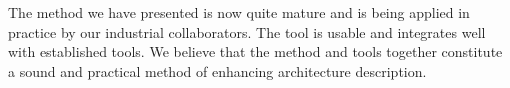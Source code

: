 \documentclass{llncs}
\begin{document}
The method we have presented is now quite mature and is being applied in practice by our industrial collaborators. The tool is usable and integrates well with established tools. We believe that the method and tools together constitute a sound and practical method of enhancing architecture description.





\renewcommand{\baselinestretch}{0.98}

{\small
}
\renewcommand{\baselinestretch}{1}
\end{document}
